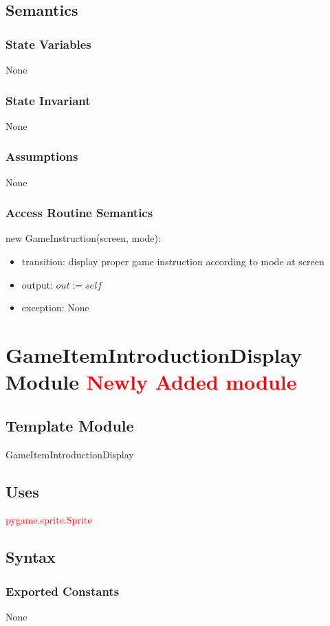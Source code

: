 \documentclass[12pt]{article}
\begin{document}
\subsection*{Semantics}
\subsubsection*{State Variables}
None
\subsubsection*{State Invariant}
None
\subsubsection*{Assumptions}
None
\subsubsection*{Access Routine Semantics}
\noindent new GameInstruction(screen, mode):
\begin{itemize}
\item transition: display proper game instruction according to mode at screen
\item output: $out := \mathit{self}$
\item exception: None
\end{itemize}
\newpage

\section{GameItemIntroductionDisplay Module \textcolor{red}{Newly Added module}}

\subsection*{Template Module}
GameItemIntroductionDisplay

\subsection*{Uses}
\textcolor{red}{pygame.sprite.Sprite}

\subsection*{Syntax}
\subsubsection*{Exported Constants}
None
\end{document}
